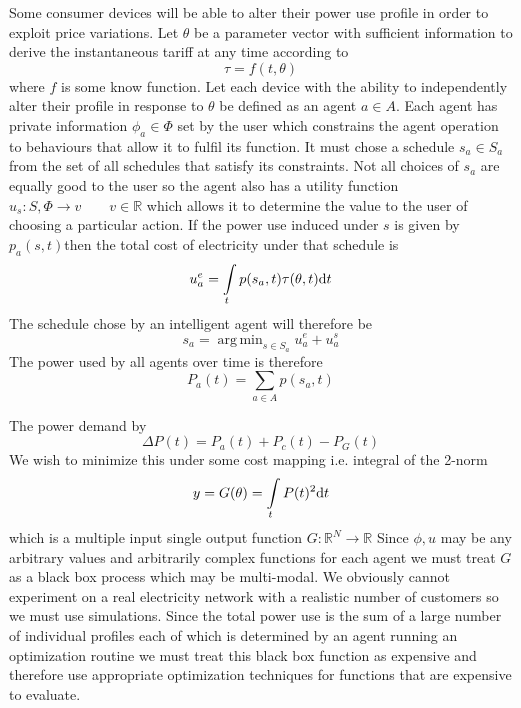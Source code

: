 \documentclass[11pt]{article}
\DeclareMathOperator*{\argmin}{arg\,min}
\begin{document}
Some consumer devices will be able to alter their power use profile in order to
exploit price variations. Let $\theta$ be a parameter vector with sufficient information
to derive the instantaneous tariff at any time according to
\begin{equation}
\tau = f(t, \theta)
\end{equation}
where $f$ is some know function. Let each device with the ability to independently alter their profile in response to $\theta$ be defined as an agent $a \in A$.
Each agent has private information $\phi_{a} \in \Phi $ set by the user which constrains the
agent operation to behaviours that allow it to fulfil its function. It must chose a
schedule $s_{a} \in S_{a}$ from the set of all schedules that satisfy its constraints. Not all
choices of $s_{a}$ are equally good to the user so the agent also has a utility function
$u_{s} : S, \Phi \rightarrow v\qquad v \in \mathbb{R} $ which allows it to determine the value to the user of choosing a
particular action. If the power use induced under $s$ is given by $ p_{a} (s, t) $then the total cost of
electricity under that schedule is
\begin{equation}
u_{a}^{e} = \intop_{t} p(s_{a}, t) \tau(\theta, t) \mathrm{d}t
\end{equation}
The schedule chose by an intelligent agent will therefore be
\begin{equation}
s_{a} = \argmin _{s \in S_{a}} u_{a}^{e} + u_{a}^{s}
\end{equation}
The power used by all agents over time is therefore
\begin{equation}
P_{a}(t) = \sum_{a \in A} p (s_{a} , t)
\end{equation}

The power demand
by
\begin{equation}
\Delta P (t) = P_{a} (t) + P_{c} (t) - P_{G} (t)
\end{equation}
We wish to minimize this under some cost mapping i.e. integral of the 2-norm
\begin{equation}
y = G(\theta) = \intop_{t} P (t)^{2} \mathrm{d}t
\end{equation}
which is a multiple input single output function $G : \mathbb{R}^{N} \rightarrow \mathbb{R}$
Since $\phi, u$ may be any arbitrary values and arbitrarily complex functions for
each agent we must treat $G$ as a black box process which may be multi-modal.
We obviously cannot experiment on a real electricity network with a realistic
number of customers so we must use simulations. Since the total power use is
the sum of a large number of individual profiles each of which is determined by
an agent running an optimization routine we must treat this black box function
as expensive and therefore use appropriate optimization techniques for functions
that are expensive to evaluate.
\end{document}
